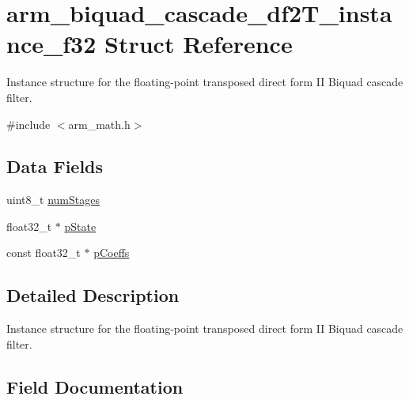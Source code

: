 \hypertarget{structarm__biquad__cascade__df2_t__instance__f32}{}\section{arm\+\_\+biquad\+\_\+cascade\+\_\+df2\+T\+\_\+instance\+\_\+f32 Struct Reference}
\label{structarm__biquad__cascade__df2_t__instance__f32}


Instance structure for the floating-\/point transposed direct form II Biquad cascade filter.  




{\ttfamily \#include $<$arm\+\_\+math.\+h$>$}

\subsection*{Data Fields}
\begin{DoxyCompactItemize}
\item 
uint8\+\_\+t \mbox{\hyperlink{structarm__biquad__cascade__df2_t__instance__f32_a3615af038f56917909e0370c11bc2ec7}{num\+Stages}}
\item 
float32\+\_\+t $\ast$ \mbox{\hyperlink{structarm__biquad__cascade__df2_t__instance__f32_a335c87e6fdc4b96601d95a5de8b9c463}{p\+State}}
\item 
const float32\+\_\+t $\ast$ \mbox{\hyperlink{structarm__biquad__cascade__df2_t__instance__f32_a39230f04a29d8321948e339633780442}{p\+Coeffs}}
\end{DoxyCompactItemize}


\subsection{Detailed Description}
Instance structure for the floating-\/point transposed direct form II Biquad cascade filter. 

\subsection{Field Documentation}
\mbox{\label{structarm__biquad__cascade__df2_t__instance__f32_a3615af038f56917909e0370c11bc2ec7}} 

